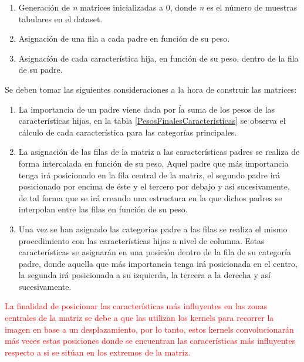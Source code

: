         \begin{enumerate}

            \item Generación de \textit{n} matrices inicializadas a 0, donde \textit{n} es el número de muestras tabulares en el dataset.
            \item Asignación de una fila a cada padre en función de su peso.
            \item Asignacíón de cada característica hija, en función de su peso, dentro de la fila de su padre.
        
        \end{enumerate}

        Se deben tomar las siguientes consideraciones a la hora de construir las matrices:

        \begin{enumerate}

            \item La importancia de un padre viene dada por ĺa suma de los pesos de las características hijas, en la tabla \ref{PesosFinalesCaracteristicas} se observa el cálculo de cada característica para las categorías principales.

            \item La asignación de las filas de la matriz a las características padres se realiza de forma intercalada en función de su peso. Aquel padre que más importancia tenga irá posicionado en la fila central de la matriz, el segundo padre irá posicionado por encima de éste y el tercero por debajo y así sucesivamente, de tal forma que se irá creando una estructura en la que dichos padres se interpolan entre las filas en función de su peso.

            \item Una vez se han asignado las categorías padre a las filas se realiza el mismo procedimiento con las características hijas a nivel de columna. Estas características se asignarán en una posición dentro de la fila de su categoría padre, donde aquella que más importancia tenga irá posicionada en el centro, la segunda irá posicionada a su izquierda, la tercera a la derecha y así sucesivamente.
        \end{enumerate}


        \textcolor{red}{La finalidad de posicionar las características más influyentes en las zonas centrales de la matriz se debe a que las  utilizan los kernels para recorrer la imagen en base a un desplazamiento, por lo tanto, estos kernels convolucionarán más veces estas posiciones donde se encuentran las caracerísticas más influyentes respecto a si se sitúan en los extremos de la matriz.}

